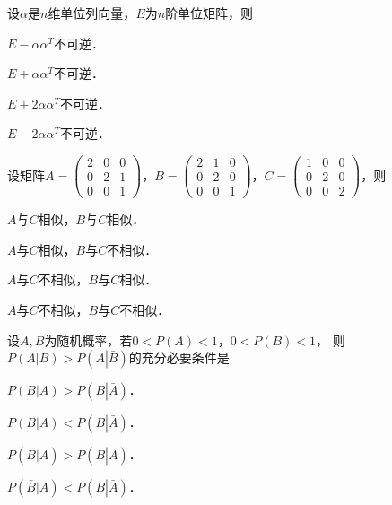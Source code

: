 \documentclass[plain,noanswer,medmath]{../../template/jnuexam}
\begin{document}
\begin{problem}
设$\alpha$是$n$维单位列向量，$E$为$n$阶单位矩阵，则\pickout{}
\begin{abcd}
\item $E - \alpha \alpha^T$不可逆．
\item $E + \alpha \alpha^T$不可逆．
\item $E + 2\alpha \alpha^T$不可逆．
\item $E - 2\alpha \alpha^T$不可逆．
\end{abcd}
\end{problem}


\begin{problem}
设矩阵$A = \begin{pmatrix}
  2 & 0 & 0 \\
  0 & 2 & 1 \\
  0 & 0 & 1
\end{pmatrix}$，$B = \begin{pmatrix}
  2 & 1 & 0 \\
  0 & 2 & 0 \\
  0 & 0 & 1
\end{pmatrix}$，$C = \begin{pmatrix}
  1 & 0 & 0 \\
  0 & 2 & 0 \\
  0 & 0 & 2
\end{pmatrix}$，则\pickout{}
\begin{abcd}
\item $A$与$C$相似，$B$与$C$相似．
\item $A$与$C$相似，$B$与$C$不相似．
\item $A$与$C$不相似，$B$与$C$相似．
\item $A$与$C$不相似，$B$与$C$不相似．
\end{abcd}
\end{problem}


\begin{problem}
设$A,B$为随机概率，若$0 < P(A) < 1$，$0 < P(B) < 1$，
则$P(A\left| B \right.) > P(A\left| \bar B \right.)$的充分必要条件是\pickout{}
\begin{abcd}
\item $P(B\left| A \right.) > P(B\left| \bar A \right.)$．
\item $P(B\left| A \right.) < P(B\left| \bar A \right.)$．
\item $P(\bar B\left| A \right.) > P(B\left| \bar A \right.)$．
\item $P(\bar B\left| A \right.) < P(B\left| \bar A \right.)$．
\end{abcd}
\end{problem}
\end{document}
